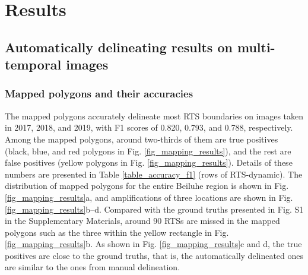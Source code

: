 \documentclass[authoryear,preprint,review,12pt]{elsarticle}
\begin{document}
\section{Results}
\label{sec_result}


\subsection{Automatically delineating results on multi-temporal images}
\label{sec_result_auto_deliea}


\subsubsection{Mapped polygons and their accuracies} %
\label{sec_mapped_polygons}

The mapped polygons accurately delineate most RTS boundaries on images taken in 2017, 2018, and 2019, with F1 scores of 0.820, 0.793, and 0.788, respectively.
Among the mapped polygons, around two-thirds of them are true positives (black, blue, and red polygons in Fig. \ref{fig_mapping_results}), and the rest are false positives (yellow polygons in Fig. \ref{fig_mapping_results}). 
Details of these numbers are presented in Table \ref{table_accuracy_f1} (rows of RTS-dynamic).
The distribution of mapped polygons for the entire Beiluhe region is shown in Fig. \ref{fig_mapping_results}a, and amplifications of three locations are shown in Fig. \ref{fig_mapping_results}b--d. 
Compared with the ground truths presented in Fig. S1 in the Supplementary Materials,  around 90 RTSs are missed in the mapped polygons such as the three within the yellow rectangle in Fig. \ref{fig_mapping_results}b.
As shown in Fig. \ref{fig_mapping_results}c and d, the true positives are close to the ground truths, that is, the automatically delineated ones are similar to the ones from manual delineation. 

\end{document}
